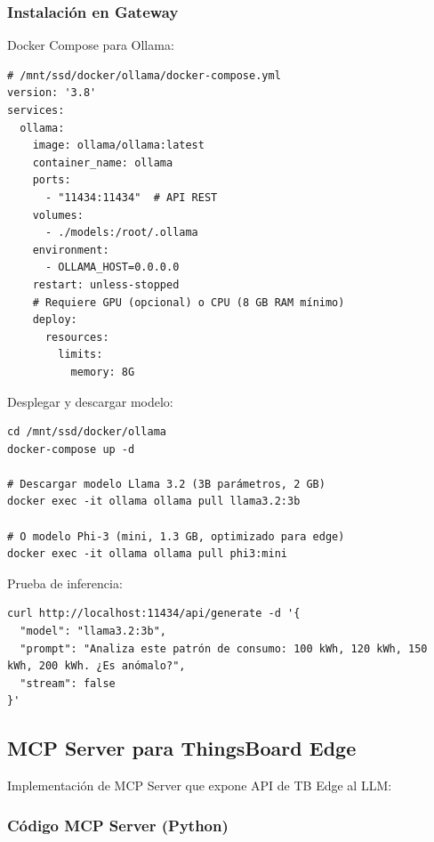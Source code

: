 \subsubsection{Instalación en Gateway}

Docker Compose para Ollama:
\begin{verbatim}
# /mnt/ssd/docker/ollama/docker-compose.yml
version: '3.8'
services:
  ollama:
    image: ollama/ollama:latest
    container_name: ollama
    ports:
      - "11434:11434"  # API REST
    volumes:
      - ./models:/root/.ollama
    environment:
      - OLLAMA_HOST=0.0.0.0
    restart: unless-stopped
    # Requiere GPU (opcional) o CPU (8 GB RAM mínimo)
    deploy:
      resources:
        limits:
          memory: 8G
\end{verbatim}

Desplegar y descargar modelo:
\begin{verbatim}
cd /mnt/ssd/docker/ollama
docker-compose up -d

# Descargar modelo Llama 3.2 (3B parámetros, 2 GB)
docker exec -it ollama ollama pull llama3.2:3b

# O modelo Phi-3 (mini, 1.3 GB, optimizado para edge)
docker exec -it ollama ollama pull phi3:mini
\end{verbatim}

Prueba de inferencia:
\begin{verbatim}
curl http://localhost:11434/api/generate -d '{
  "model": "llama3.2:3b",
  "prompt": "Analiza este patrón de consumo: 100 kWh, 120 kWh, 150 kWh, 200 kWh. ¿Es anómalo?",
  "stream": false
}'
\end{verbatim}

\subsection{MCP Server para ThingsBoard Edge}

Implementación de MCP Server que expone API de TB Edge al LLM:

\subsubsection{Código MCP Server (Python)}

